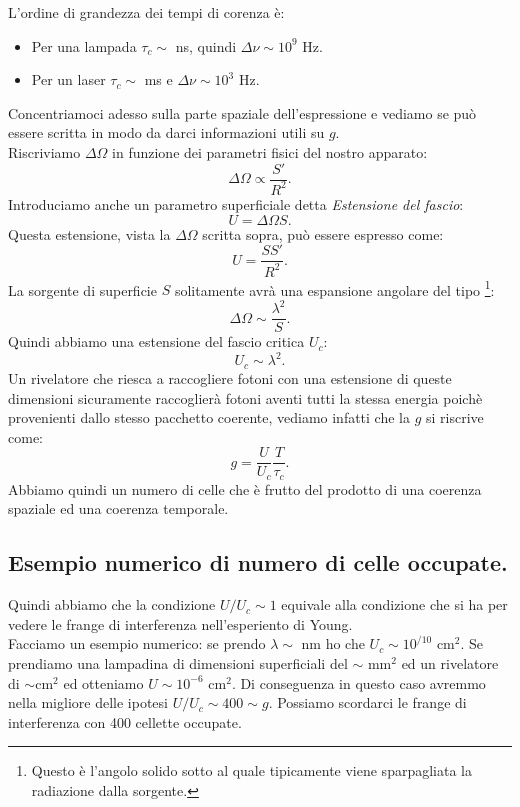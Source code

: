 L'ordine di grandezza dei tempi di corenza è:
\begin{itemize}
	\item Per una lampada $\tau _c \sim $ ns, quindi $\Delta \nu \sim 10^9$ Hz.
	\item Per un laser $\tau_c \sim $ ms e $\Delta \nu \sim 10^3$ Hz.
\end{itemize}
Concentriamoci adesso sulla parte spaziale dell'espressione e vediamo se può essere scritta in modo da darci informazioni utili su $g$.\\
Riscriviamo $\Delta \Omega $ in funzione dei parametri fisici del nostro apparato:
\[
	\Delta \Omega \propto \frac{S'}{R^2}
.\] 
Introduciamo anche un parametro superficiale detta \textit{Estensione del fascio}:
\[
	U = \Delta \Omega S
.\] 
Questa estensione, vista la $\Delta \Omega $ scritta sopra, può essere espresso come:
\[
	U = \frac{SS'}{R^2}
.\] 
La sorgente di superficie $S$ solitamente avrà una espansione angolare del tipo \footnote{Questo è l'angolo solido sotto al quale tipicamente viene sparpagliata la radiazione dalla sorgente.}:
\[
	\Delta \Omega \sim \frac{\lambda ^2}{S}
.\] 
Quindi abbiamo una estensione del fascio critica $U_c$:
\[
	U_c \sim \lambda ^2
.\] 
Un rivelatore che riesca a raccogliere fotoni con una estensione di queste dimensioni sicuramente raccoglierà fotoni aventi tutti la stessa energia poichè provenienti dallo stesso pacchetto coerente, vediamo infatti che la $g$ si riscrive come:
\[
	g=\frac{U}{U_c}\frac{T}{\tau _c}
.\] 
Abbiamo quindi un numero di celle che è frutto del prodotto di una coerenza spaziale ed una coerenza temporale.\\

\subsection{Esempio numerico di numero di celle occupate.}
\label{subsec:Esempio numerico di numero di celle occupate.}
Quindi abbiamo che la condizione $U / U_c \sim 1$ equivale alla condizione che si ha per vedere le frange di interferenza nell'esperiento di Young.\\
Facciamo un esempio numerico: 
se prendo $\lambda \sim $ nm ho che $U_c \sim 10^{/10}$ cm$^2$.
Se prendiamo una lampadina di dimensioni superficiali del  $\sim $ mm$^2$ ed un rivelatore di $\sim $cm$^2$ ed otteniamo $U\sim 10^{-6}$ cm$^2$. 
Di conseguenza in questo caso avremmo nella migliore delle ipotesi $U / U_c \sim 400 \sim g$. Possiamo scordarci le frange di interferenza con 400 cellette occupate.\\

